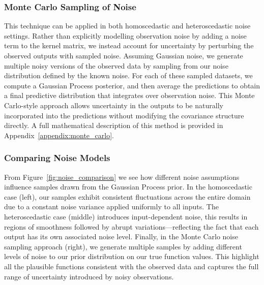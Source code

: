 \documentclass[12pt]{article}
\begin{document}
\subsubsection*{Monte Carlo Sampling of Noise}  

This technique can be applied in both homoscedastic and heteroscedastic noise settings. Rather than explicitly modelling observation noise by adding a noise term to the kernel matrix, we instead account for uncertainty by perturbing the observed outputs with sampled noise.
Assuming Gaussian noise, we generate multiple noisy versions of the observed data by sampling from our noise distribution defined by the known noise. For each of these sampled datasets, we compute a Gaussian Process posterior, and then average the predictions to obtain a final predictive distribution that integrates over observation noise.
This Monte Carlo-style approach allows uncertainty in the outputs to be naturally incorporated into the predictions without modifying the covariance structure directly. A full mathematical description of this method is provided in Appendix~\ref{appendix:monte_carlo}.

%
%
\subsubsection*{Comparing Noise Models}
From Figure~\ref{fig:noise_comparison} we see how different noise assumptions influence samples drawn from the Gaussian Process prior. 
In the homoscedastic case (left), our samples exhibit consistent fluctuations across the entire domain due to a constant noise variance applied uniformly to all inputs. 
The heteroscedastic case (middle) introduces input-dependent noise, this results in regions of smoothness followed by abrupt variations—reflecting the fact that each output has its own associated noise level.
Finally, in the Monte Carlo noise sampling approach (right), we generate multiple samples by adding different levels of noise to our prior distribution on our true function values.
This highlight all the plausible functions consistent with the observed data and captures the full range of uncertainty introduced by noisy observations.
\end{document}
